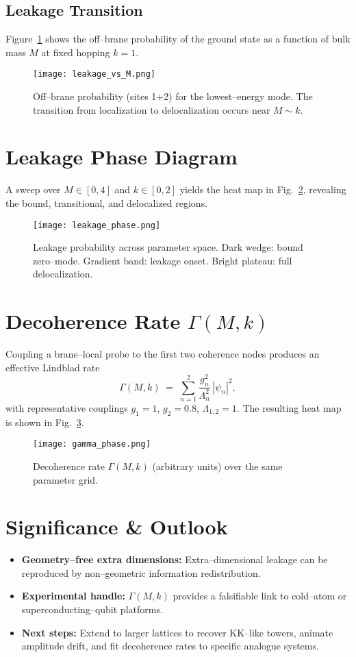 \documentclass[11pt]{article}
\begin{document}
\subsection{Leakage Transition}
Figure~\ref{fig:leakage} shows the off--brane probability of the ground state
as a function of bulk mass $M$ at fixed hopping $k=1$.

\begin{figure}[h]
    \centering
    \texttt{[image: leakage\_vs\_M.png]}
    \caption{Off--brane probability (sites 1+2) for the lowest--energy mode.
    The transition from localization to delocalization occurs near
    $M\!\sim\!k$.}
    \label{fig:leakage}
\end{figure}

\section{Leakage Phase Diagram}
A sweep over $M\in[0,4]$ and $k\in[0,2]$ yields the heat map in
Fig.~\ref{fig:phase}, revealing the bound, transitional, and delocalized
regions.

\begin{figure}[h]
    \centering
    \texttt{[image: leakage\_phase.png]}
    \caption{Leakage probability across parameter space.  Dark wedge: bound
    zero--mode.  Gradient band: leakage onset.  Bright plateau: full
    delocalization.}
    \label{fig:phase}
\end{figure}

\section{Decoherence Rate $\Gamma(M,k)$}
Coupling a brane--local probe to the first two coherence nodes produces an
effective Lindblad rate
\[
\Gamma(M,k)\;=\;\sum_{n=1}^{2} \frac{g_n^{2}}{\Lambda_n^{2}}\,|\psi_n|^{2},
\]
with representative couplings $g_1=1$, $g_2=0.8$, $\Lambda_{1,2}=1$.
The resulting heat map is shown in Fig.~\ref{fig:gamma}.

\begin{figure}[h]
    \centering
    \texttt{[image: gamma\_phase.png]}
    \caption{Decoherence rate $\Gamma(M,k)$ (arbitrary units) over the same
    parameter grid.}
    \label{fig:gamma}
\end{figure}

\section{Significance \& Outlook}
\begin{itemize}
    \item \textbf{Geometry--free extra dimensions:} Extra--dimensional leakage
    can be reproduced by non--geometric information redistribution.
    \item \textbf{Experimental handle:} $\Gamma(M,k)$ provides a falsifiable
    link to cold--atom or superconducting--qubit platforms.
    \item \textbf{Next steps:} Extend to larger lattices to recover KK--like
    towers, animate amplitude drift, and fit decoherence rates to specific
    analogue systems.
\end{itemize}
\end{document}
